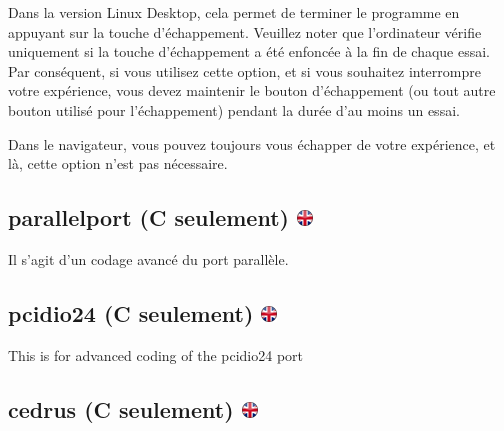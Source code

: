 \documentclass[
]{book}
\begin{document}
Dans la version Linux Desktop, cela permet de terminer le programme en appuyant sur la touche d'échappement. Veuillez noter que l'ordinateur vérifie uniquement si la touche d'échappement a été enfoncée à la fin de chaque essai. Par conséquent, si vous utilisez cette option, et si vous souhaitez interrompre votre expérience, vous devez maintenir le bouton d'échappement (ou tout autre bouton utilisé pour l'échappement) pendant la durée d'au moins un essai.

Dans le navigateur, vous pouvez toujours vous échapper de votre expérience, et là, cette option n'est pas nécessaire.

\hypertarget{parallelport-c-seulement}{%
\subsection[parallelport (C seulement) ]{\texorpdfstring{parallelport (C seulement) \href{https://www.psytoolkit.org/doc3.4.0/syntax.html\#options-parallelport}{\protect\includegraphics{img/ukflag.png}}}{parallelport (C seulement) }}\label{parallelport-c-seulement}}

Il s'agit d'un codage avancé du port parallèle.

\hypertarget{pcidio24-c-seulement}{%
\subsection[pcidio24 (C seulement) ]{\texorpdfstring{pcidio24 (C seulement) \href{https://www.psytoolkit.org/doc3.4.0/syntax.html\#options-pcidio24}{\protect\includegraphics{img/ukflag.png}}}{pcidio24 (C seulement) }}\label{pcidio24-c-seulement}}

This is for advanced coding of the pcidio24 port

\hypertarget{cedrus-c-seulement}{%
\subsection[cedrus (C seulement) ]{\texorpdfstring{cedrus (C seulement) \href{https://www.psytoolkit.org/doc3.4.0/syntax.html\#options-cedrus}{\protect\includegraphics{img/ukflag.png}}}{cedrus (C seulement) }}\label{cedrus-c-seulement}}
\end{document}
